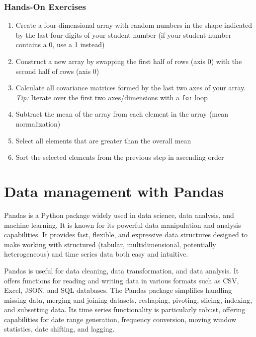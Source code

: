 

\begin{tcolorbox}[colback=code]
\subsubsection*{Hands-On Exercises}
\begin{enumerate}
   \item Create a four-dimensional array with random numbers in the shape indicated by the last four digits of your student number (if your student number contains a 0, use a 1 instead)
   \item Construct a new array by swapping the first half of rows (axis 0) with the second half of rows (axis 0)
   \item Calculate all covariance matrices formed by the last two axes of your array. \emph{Tip:} Iterate over the first two axes/dimensions with a \texttt{for} loop
   \item Subtract the mean of the array from each element in the array (mean normalization)
   \item Select all elements that are greater than the overall mean
   \item Sort the selected elements from the previous step in ascending order
\end{enumerate}
\end{tcolorbox}

\section{Data management with Pandas}

Pandas is a Python package widely used in data science, data analysis, and machine learning. It is known for its powerful data manipulation and analysis capabilities. It provides fast, flexible, and expressive data structures designed to make working with structured (tabular, multidimensional, potentially heterogeneous) and time series data both easy and intuitive. 

Pandas is useful for data cleaning, data transformation, and data analysis. It offers functions for reading and writing data in various formats such as CSV, Excel, JSON, and SQL databases. The Pandas package simplifies handling missing data, merging and joining datasets, reshaping, pivoting, slicing, indexing, and subsetting data. Its time series functionality is particularly robust, offering capabilities for date range generation, frequency conversion, moving window statistics, date shifting, and lagging.

